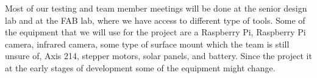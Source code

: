 Most of our testing and team member meetings will be done at the senior design lab and at the FAB lab, where we have access to different type of tools. Some of the equipment that we will use for the project are a Raspberry Pi, Raspberry Pi camera, infrared camera, some type of surface mount which the team is still unsure of, Axis 214, stepper motors, solar panels, and battery. Since the project it at the early stages of development some of the equipment might change.
